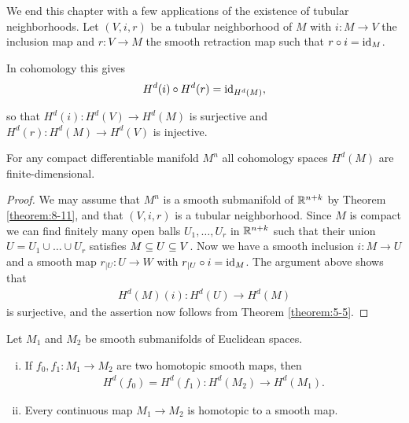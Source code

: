 We end this chapter with a few applications of the existence of tubular neighborhoods. 
Let $(V, i, r)$ be a tubular neighborhood of $M$ with $i:M\to V$ the inclusion map 
and $r:V\to M$ the smooth retraction map such that $r\circ i=\operatorname{id}_M$.

In cohomology this gives
\begin{align*}
  H^d(i)\circ H^d(r) =\operatorname{id}_{H^d(M)},
\end{align*}

so that $H^d(i):H^d(V)\to H^d(M)$ is surjective and $H^d(r):H^d(M)\to H^d(V)$ is injective.

\begin{proposition}\label{prop:9-25}
  For any compact differentiable manifold $M^n$ all cohomology spaces $H^d(M)$ are 
  finite-dimensional.
\end{proposition}


\begin{proof}
  We may assume that $M^n$ is a smooth submanifold of ${\mathbb{R}}^{n+k}$ by Theorem \ref{theorem:8-11}, 
  and that $(V, i, r)$ is a tubular neighborhood. Since $M$ is compact we can find
  finitely many open balls $U_1, \ldots, U_r$ in ${\mathbb{R}}^{n+k}$ such that their union $U=U_1\cup\ldots\cup U_r$
  satisfies $M\subseteq U\subseteq V$. Now we have a smooth inclusion $i:M\to U$ and a smooth
  map $r_{|U}:U\to W$ with $r_{|U}\circ i = \operatorname{id}_M$. The argument above shows that
  \begin{align*}
    H^d(M)(i):H^d(U)\to H^d(M)
  \end{align*}
  is surjective, and the assertion now follows from Theorem \ref{theorem:5-5}.
\end{proof}

\begin{proposition}\label{prop:9-26}
  Let $M_1$ and $M_2$ be smooth submanifolds of Euclidean spaces. 
  \begin{enumerate}[(i)]
    \item If $f_0, f_1:M_1\to M_2$ are two homotopic smooth maps, then 
      \begin{align*}
        H^d(f_0) = H^d(f_1):H^d(M_2)\to H^d(M_1).
      \end{align*}
    \item Every continuous map $M_1\to M_2$ is homotopic to a smooth map.
  \end{enumerate}
\end{proposition}

